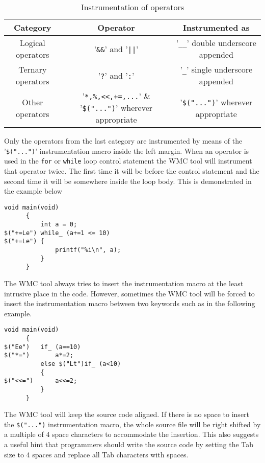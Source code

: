 \begin{table}[!hb]
\centering\small
\caption{Instrumentation of operators}
\begin{tabular}{|c|c|c|}
\hline
\textbf{Category} & \textbf{Operator} & \textbf{Instrumented as} \\
\hline
Logical operators & '\verb|&&|' and '\verb$||$' & '\verb|__|' double underscore appended \\
\hline
Ternary operators & '\verb|?|' and '\verb|:|' & '\verb|_|' single underscore appended \\
\hline
Other operators & '\verb|*,%,<<,+=,...|' & '\verb|$("...")|' wherever appropriate \\
\hline
\end{tabular}
\label{tab:instrumentation_of_operators}
\end{table}

Only the operators from the last category are instrumented by means of the '\verb|$("...")|' instrumentation macro inside the left margin. When an operator is used in the \verb|for| or \verb|while| loop control statement the WMC tool will instrument that operator twice. The first time it will be before the control statement and the second time it will be somewhere inside the loop body. This is demonstrated in the example below

\begin{Verbatim}[fontsize=\small]
      void main(void)
      {
          int a = 0;
$("+=Le") while_ (a+=1 <= 10)
$("+=Le") {
              printf("%i\n", a);
          }
      }
\end{Verbatim}

The WMC tool always tries to insert the instrumentation macro at the least intrusive place in the code. However, sometimes the WMC tool will be forced to insert the instrumentation macro between two keywords such as in the following example.

\begin{Verbatim}[fontsize=\small]
      void main(void)
      {
$("Ee")   if_ (a==10)
$("*=")       a*=2;
          else $("Lt")if_ (a<10)
          {
$("<<=")      a<<=2;
          }
      }
\end{Verbatim}

The WMC tool will keep the source code aligned. If there is no space to insert the \verb|$("...")| instrumentation macro, the whole source file will be right shifted by a multiple of 4 space characters to accommodate the insertion. This also suggests a useful hint that programmers should write the source code by setting the Tab size to 4 spaces and replace all Tab characters with spaces.


